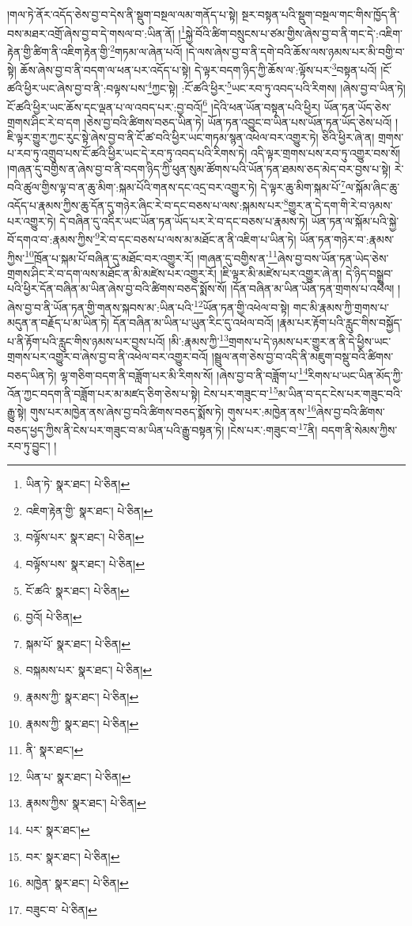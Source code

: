 །གལ་ཏེ་ནོར་འདོད་ཅེས་བྱ་བ་དེས་ནི་སྡུག་བསྔལ་ལམ་གནོད་པ་སྟེ། སྔར་བསྟན་པའི་སྡུག་བསྔལ་གང་གིས་ཁྱོད་ནི་བས་མཐར་འགྲོ་ཞེས་བྱ་བ་དེ་གསལ་བ་:ཡིན་ནོ། །\footnote{ཡིན་ཏེ་  སྣར་ཐང་།  པེ་ཅིན། }སྐྱེ་བོའི་ཚིག་བསྲུངས་པ་ཙམ་གྱིས་ཞེས་བྱ་བ་ནི་གང་དེ་:འཇིག་རྟེན་གྱི་ཚིག་ནི་འཇིག་རྟེན་གྱི་\footnote{འཇིག་རྟེན་གྱི་  སྣར་ཐང་།  པེ་ཅིན། }གཏམ་ལ་ཞེན་པའོ། །དེ་ལས་ཞེས་བྱ་བ་ནི་དགེ་བའི་ཆོས་ལས་ཉམས་པར་མི་བགྱི་བ་སྟེ། ཆོས་ཞེས་བྱ་བ་ནི་བདག་ལ་ཕན་པར་འདོད་པ་སྟེ། དེ་ལྟར་བདག་ཉིད་ཀྱི་ཆོས་ལ་:ལྟོས་པར་\footnote{བལྟོས་པར་  སྣར་ཐང་།  པེ་ཅིན། }བསྟན་པའོ། །ངོ་ཚའི་ཕྱིར་ཡང་ཞེས་བྱ་བ་ནི་:བལྟས་པས་\footnote{བལྟོས་པས་  སྣར་ཐང་།  པེ་ཅིན། }ཀྱང་སྟེ། :ངོ་ཚའི་ཕྱིར་\footnote{ངོ་ཚའི་  སྣར་ཐང་།  པེ་ཅིན། }ཡང་རབ་ཏུ་འབད་པའི་རིགས། །ཞེས་བྱ་བ་ཡིན་ཏེ། ངོ་ཚའི་ཕྱིར་ཡང་ཆོས་དང་ལྡན་པ་ལ་འབད་པར་:བྱ་བའོ།\footnote{བྱའོ།  པེ་ཅིན། } །དེའི་ཕན་ཡོན་བསྟན་པའི་ཕྱིར། ཡོན་ཏན་ཡོད་ཅེས་གྲགས་ཤིང་རེ་བ་དག །ཅེས་བྱ་བའི་ཚིགས་བཅད་ཡིན་ཏེ། ཡོན་ཏན་འབྱུང་བ་ཡིན་པས་ཡོན་ཏན་ཡོད་ཅེས་པའོ། །ཇི་ལྟར་གྱུར་ཀྱང་རུང་སྟེ་ཞེས་བྱ་བ་ནི་ངོ་ཚ་བའི་ཕྱིར་ཡང་གཏམ་སྙན་འཕེལ་བར་འགྱུར་ཏེ། ཅིའི་ཕྱིར་ཞེ་ན། གྲགས་པ་རབ་ཏུ་འགྲུབ་པས་ངོ་ཚའི་ཕྱིར་ཡང་དེ་རབ་ཏུ་འབད་པའི་རིགས་ཏེ། འདི་ལྟར་གྲགས་པས་རབ་ཏུ་འགྱུར་བས་སོ། །གཞན་དུ་བགྱིས་ན་ཞེས་བྱ་བ་ནི་བདག་ཉིད་ཀྱི་ཕུན་སུམ་ཚོགས་པའི་ཡོན་ཏན་ཐམས་ཅད་མེད་བར་བྱས་པ་སྟེ། རེ་བའི་ཚུལ་གྱིས་ལྟ་བ་ན་ཆུ་མིག་:སྐམ་པོའི་གནས་དང་འདྲ་བར་འགྱུར་ཏེ། དེ་ལྟར་ཆུ་མིག་སྐམ་པོ་\footnote{སྐམ་པོ་  སྣར་ཐང་།  པེ་ཅིན། }ལ་སྐོམ་ཞིང་ཆུ་འདོད་པ་རྣམས་ཀྱིས་ཆུ་དོན་དུ་གཉེར་ཞིང་རེ་བ་དང་བཅས་པ་ལས་:སྐམས་པར་\footnote{བསྐམས་པར་  སྣར་ཐང་།  པེ་ཅིན། }གྱུར་ན་དེ་དག་གི་རེ་བ་ཉམས་པར་འགྱུར་ཏེ། དེ་བཞིན་དུ་འདིར་ཡང་ཡོན་ཏན་ཡོད་པར་རེ་བ་དང་བཅས་པ་རྣམས་ཏེ། ཡོན་ཏན་ལ་སྐོམ་པའི་སྐྱེ་བོ་དགའ་བ་:རྣམས་ཀྱིས་\footnote{རྣམས་ཀྱི་  སྣར་ཐང་།  པེ་ཅིན། }རེ་བ་དང་བཅས་པ་ལས་མ་མཐོང་ན་ནི་འཇིག་པ་ཡིན་ཏེ། ཡོན་ཏན་གཉེར་བ་:རྣམས་ཀྱིས་\footnote{རྣམས་ཀྱི་  སྣར་ཐང་།  པེ་ཅིན། }ཁྲོན་པ་སྐམ་པོ་བཞིན་དུ་མཐོང་བར་འགྱུར་རོ། །གཞན་དུ་བགྱིས་ན་\footnote{ནི་  སྣར་ཐང་། }ཞེས་བྱ་བས་ཡོན་ཏན་ཡེད་ཅེས་གྲགས་ཤིང་རེ་བ་དག་ལས་མཐོང་ན་མི་མཛེས་པར་འགྱུར་རོ། །ཇི་ལྟར་མི་མཛེས་པར་འགྱུར་ཞེ་ན། དེ་ཉིད་བསྒྲུབ་པའི་ཕྱིར་དོན་བཞིན་མ་ཡིན་ཞེས་བྱ་བའི་ཚིགས་བཅད་སྨོས་སོ། །དོན་བཞིན་མ་ཡིན་ཡོན་ཏན་གྲགས་པ་འཕེལ། །ཞེས་བྱ་བ་ནི་ཡོན་ཏན་གྱི་གནས་སྐབས་མ་:ཡིན་པའི་\footnote{ཡིན་པ་  སྣར་ཐང་།  པེ་ཅིན། }ཡོན་ཏན་གྱི་འཕེལ་བ་སྟེ། གང་མི་རྣམས་ཀྱི་གྲགས་པ་མདུན་ན་བརྗོད་པ་མ་ཡིན་ཏེ། དོན་བཞིན་མ་ཡིན་པ་ཡུན་རིང་དུ་འཕེལ་བའོ། །རྣམ་པར་རྟོག་པའི་རླུང་གིས་བསྐྱོད་པ་ནི་རྟོག་པའི་རླུང་གིས་ཉམས་པར་བྱས་པའོ། །མི་:རྣམས་ཀྱི་\footnote{རྣམས་ཀྱིས་  སྣར་ཐང་།  པེ་ཅིན། }གྲགས་པ་དེ་ཉམས་པར་གྱུར་ན་ནི་དེ་ཕྱིས་ཡང་གྲགས་པར་འགྱུར་བ་ཞེས་བྱ་བ་ནི་འཕེལ་བར་འགྱུར་བའོ། །སྦྲུལ་ནག་ཅེས་བྱ་བ་འདི་ནི་མཇུག་བསྡུ་བའི་ཚིགས་བཅད་ཡིན་ཏེ། ལྷ་གཅིག་བདག་ནི་བཟློག་པར་མི་རིགས་སོ། །ཞེས་བྱ་བ་ནི་བཟློག་པ་\footnote{པར་  སྣར་ཐང་། }རིགས་པ་ཡང་ཡིན་མོད་ཀྱི་འོན་ཀྱང་བདག་ནི་བཟློག་པར་མ་མཛད་ཅིག་ཅེས་པ་སྟེ། ངེས་པར་གཟུང་བ་\footnote{བར་  སྣར་ཐང་།  པེ་ཅིན། }མ་ཡིན་བ་དང་ངེས་པར་གཟུང་བའི་རྒྱུ་སྟེ། གུས་པར་མཁྱེན་ནས་ཞེས་བྱ་བའི་ཚིགས་བཅད་སྨོས་ཏེ། གུས་པར་:མཁྱེན་ནས་\footnote{མཁྱེན་  སྣར་ཐང་།  པེ་ཅིན། }ཞེས་བྱ་བའི་ཚིགས་བཅད་ཕྱད་ཀྱིས་ནི་ངེས་པར་གཟུང་བ་མ་ཡིན་པའི་རྒྱུ་བསྟན་ཏེ། །ངེས་པར་:གཟུང་བ་\footnote{བཟུང་བ་  པེ་ཅིན། }ནི། བདག་ནི་སེམས་ཀྱིས་རབ་ཏུ་བྱུང་། །

